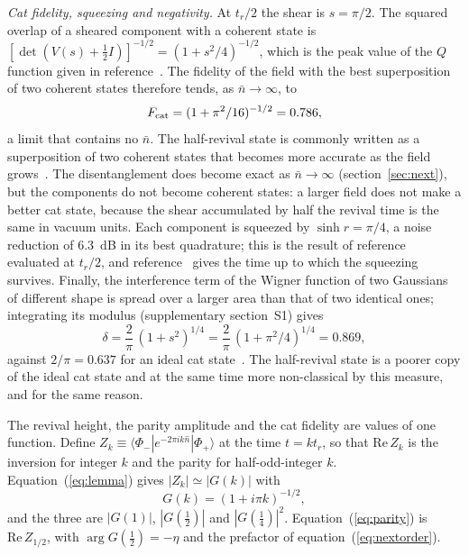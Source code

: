 \documentclass{iopjournal}
\newcommand{\nbar}{\bar{n}}
\newcommand{\ket}[1]{|#1\rangle}
\newcommand{\bra}[1]{\langle #1|}
\begin{document}
\textit{Cat fidelity, squeezing and negativity.} At $t_r/2$ the shear is $s = \pi/2$. The squared overlap of a sheared component with a coherent state is $[\det(V(s)+\tfrac12 I)]^{-1/2} = (1+s^2/4)^{-1/2}$, which is the peak value of the $Q$ function given in reference~\cite{gea-banacloche1991}. The fidelity of the field with the best superposition of two coherent states therefore tends, as $\nbar\to\infty$, to
\begin{equation}
F_{\rm cat} = (1+\pi^2/16)^{-1/2} = 0.786,
\label{eq:fidelity}
\end{equation}
a limit that contains no $\nbar$. The half-revival state is commonly written as a superposition of two coherent states that becomes more accurate as the field grows~\cite{larson2021}. The disentanglement does become exact as $\nbar\to\infty$ (section~\ref{sec:next}), but the components do not become coherent states: a larger field does not make a better cat state, because the shear accumulated by half the revival time is the same in vacuum units. Each component is squeezed by $\sinh r = \pi/4$, a noise reduction of 6.3~dB in its best quadrature; this is the result of reference~\cite{gea-banacloche1991} evaluated at $t_r/2$, and reference~\cite{woods1993} gives the time up to which the squeezing survives. Finally, the interference term of the Wigner function of two Gaussians of different shape is spread over a larger area than that of two identical ones; integrating its modulus (supplementary section~S1) gives
\begin{equation}
\delta = \frac{2}{\pi}\,(1+s^2)^{1/4} = \frac{2}{\pi}\,(1+\pi^2/4)^{1/4} = 0.869,
\label{eq:negativity}
\end{equation}
against $2/\pi = 0.637$ for an ideal cat state~\cite{kenfack2004}. The half-revival state is a poorer copy of the ideal cat state and at the same time more non-classical by this measure, and for the same reason.

The revival height, the parity amplitude and the cat fidelity are values of one function. Define $Z_k \equiv \bra{\Phi_-}e^{-2\pi ik\hat{n}}\ket{\Phi_+}$ at the time $t = kt_r$, so that $\mathrm{Re}\,Z_k$ is the inversion for integer $k$ and the parity for half-odd-integer $k$. Equation~(\ref{eq:lemma}) gives $|Z_k| \simeq |G(k)|$ with
\begin{equation}
G(k) = (1+i\pi k)^{-1/2},
\label{eq:G}
\end{equation}
and the three are $|G(1)|$, $|G(\tfrac12)|$ and $|G(\tfrac14)|^2$. Equation~(\ref{eq:parity}) is $\mathrm{Re}\,Z_{1/2}$, with $\arg G(\tfrac12) = -\eta$ and the prefactor of equation~(\ref{eq:nextorder}).
\end{document}
